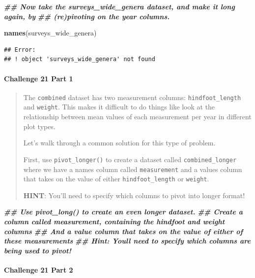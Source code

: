 \documentclass[
  10pt,
  letterpaper,
  twoside,
  openright]{book}
\newenvironment{Shaded}{\begin{snugshade}}{\end{snugshade}}
\newcommand{\DocumentationTok}[1]{\textcolor[rgb]{0.56,0.35,0.01}{\textbf{\textit{#1}}}}
\newcommand{\FunctionTok}[1]{\textcolor[rgb]{0.13,0.29,0.53}{\textbf{#1}}}
\newcommand{\NormalTok}[1]{#1}
\begin{document}
\begin{Shaded}
\begin{Highlighting}[]
\DocumentationTok{\#\# Now take the surveys\_wide\_genera dataset, and make it long again, by  }
\DocumentationTok{\#\# (re)pivoting on the year columns. }

\FunctionTok{names}\NormalTok{(surveys\_wide\_genera)}
\end{Highlighting}
\end{Shaded}

\begin{verbatim}
## Error:
## ! object 'surveys_wide_genera' not found
\end{verbatim}

\hypertarget{challenge-21-part-1}{%
\paragraph{Challenge 21 Part 1}\label{challenge-21-part-1}}

\begin{quote}
The \texttt{combined} dataset has two measurement columns:
\texttt{hindfoot\_length} and \texttt{weight}. This makes it difficult
to do things like look at the relationship between mean values of each
measurement per year in different plot types.

Let's walk through a common solution for this type of problem.

First, use \texttt{pivot\_longer()} to create a dataset called
\texttt{combined\_longer} where we have a names column called
\texttt{measurement} and a values column that takes on the value of
either \texttt{hindfoot\_length} or \texttt{weight}.

\textbf{HINT}: You'll need to specify which columns to pivot into longer
format!
\end{quote}

\begin{Shaded}
\begin{Highlighting}[]
\DocumentationTok{\#\# Use pivot\_long() to create an even longer dataset.}
\DocumentationTok{\#\# Create a column called measurement, containing the hindfoot and weight columns}
\DocumentationTok{\#\# And a value column that takes on the value of either of these measurements }
\DocumentationTok{\#\# Hint: You\textquotesingle{}ll need to specify which columns are being used to pivot!}
\end{Highlighting}
\end{Shaded}

\hypertarget{challenge-21-part-2}{%
\paragraph{Challenge 21 Part 2}\label{challenge-21-part-2}}
\end{document}
